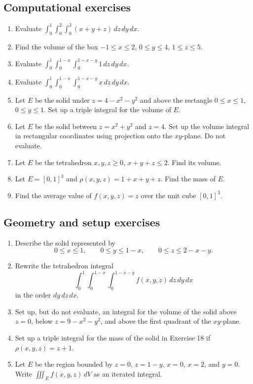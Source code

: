 \documentclass[11pt]{article}
\begin{document}
\subsection*{Computational exercises}
\begin{enumerate}[start=7]
  \item Evaluate $\int_0^1\int_0^2\int_0^3(x+y+z)\,dz\,dy\,dx$.
  \item Find the volume of the box $-1\le x\le2$, $0\le y\le4$, $1\le z\le5$.
  \item Evaluate $\int_0^1\int_0^{1-x}\int_0^{1-x-y}1\,dz\,dy\,dx$.
  \item Evaluate $\int_0^1\int_0^{1-x}\int_0^{1-x-y}x\,dz\,dy\,dx$.
  \item Let $E$ be the solid under $z=4-x^2-y^2$ and above the rectangle $0\le x\le1$, $0\le y\le1$. Set up a triple integral for the volume of $E$.
  \item Let $E$ be the solid between $z=x^2+y^2$ and $z=4$. Set up the volume integral in rectangular coordinates using projection onto the $xy$-plane. Do not evaluate.
  \item Let $E$ be the tetrahedron $x,y,z\ge0$, $x+y+z\le2$. Find its volume.
  \item Let $E=[0,1]^3$ and $\rho(x,y,z)=1+x+y+z$. Find the mass of $E$.
  \item Find the average value of $f(x,y,z)=z$ over the unit cube $[0,1]^3$.
\end{enumerate}

\subsection*{Geometry and setup exercises}
\begin{enumerate}[start=16]
  \item Describe the solid represented by
  \[
  0\le x\le1,
  \qquad
  0\le y\le1-x,
  \qquad
  0\le z\le2-x-y.
  \]
  \item Rewrite the tetrahedron integral
  \[
  \int_0^1\int_0^{1-x}\int_0^{1-x-y} f(x,y,z)\,dz\,dy\,dx
  \]
  in the order $dy\,dz\,dx$.
  \item Set up, but do not evaluate, an integral for the volume of the solid above $z=0$, below $z=9-x^2-y^2$, and above the first quadrant of the $xy$-plane.
  \item Set up a triple integral for the mass of the solid in Exercise 18 if $\rho(x,y,z)=z+1$.
  \item Let $E$ be the region bounded by $z=0$, $z=1-y$, $x=0$, $x=2$, and $y=0$. Write $\iiint_E f(x,y,z)\,dV$ as an iterated integral.
\end{enumerate}
\end{document}
